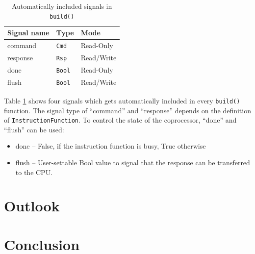 \documentclass[twoside,twocolumn]{article}
\newcommand{\code}[1]{\texttt{#1}}
\begin{document}
\begin{table}[h]
\centering
\begin{tabular}{lll}
    Signal name & Type & Mode \\
    \hline
    command & \code{Cmd} & Read-Only \\
    response & \code{Rsp} & Read/Write\\
    done & \code{Bool} & Read-Only\\
    flush & \code{Bool} & Read/Write
\end{tabular}
    \caption{Automatically included signals in \code{build()}}
    \label{tab:signals}
\end{table}
Table \ref*{tab:signals} shows four signals which gets automatically
included in every \code{build()} function. The signal type of
``command''
and ``response'' depends on the definition of
\code{InstructionFunction}. To control the state of the coprocessor,
``done'' and ``flush'' can be used:
\begin{itemize}
    \item done -- False, if the instruction function is busy, True
        otherwise
    \item flush -- User-settable Bool value to signal that the response
        can be transferred to the CPU.
\end{itemize}

\section{Outlook}
\section{Conclusion}



\end{document}
